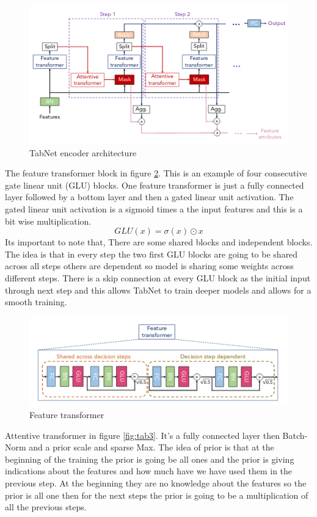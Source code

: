 \documentclass[10pt,twocolumn,letterpaper]{article}
\begin{document}
\begin{figure}[h!]
  \includegraphics[width=\linewidth]{tab1.png}
  \caption{TabNet encoder architecture}
  \label{fig:tab1}
\end{figure}

The feature transformer block in figure \ref{fig:tab2}. This is an example of four consecutive gate linear unit (GLU) blocks. One feature transformer is just a fully connected layer followed by a bottom layer and then a gated linear unit activation. The gated linear unit activation is a sigmoid times a the input features and this is a bit wise multiplication. 
$$
G L U(x)=\sigma(x) \odot x
$$
Its important to note that, There are some shared blocks and independent blocks. The idea is that in every step the two first GLU blocks are going to be shared across all steps others are dependent so model is sharing some weights across different steps. There is a skip connection at every GLU block as the initial input through next step and this allows TabNet to train deeper models and allows for a smooth training.  

\begin{figure}[h!]
  \includegraphics[width=\linewidth]{tab2.png}
  \caption{Feature transformer}
  \label{fig:tab2}
\end{figure}



Attentive transformer in figure \ref{fig:tab3}. It's a fully connected layer then Batch-Norm and a prior scale and sparse Max. The idea of prior is that at the beginning of the training the prior is going be all ones and the prior is giving indications about the features and how much have we have used them in the previous step. At the beginning they are no knowledge about the features so the prior is all one then for the next steps the prior is going to be a multiplication of all the previous steps.
\end{document}
